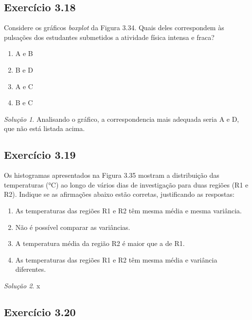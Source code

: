 \documentclass[
]{latex/krantz}
\providecommand{\tightlist}{%
  \setlength{\itemsep}{0pt}\setlength{\parskip}{0pt}}
\theoremstyle{definition}
\theoremstyle{definition}
\theoremstyle{definition}
\theoremstyle{definition}
\theoremstyle{remark}
\newtheorem*{solution}{Solução}
\begin{document}
\hypertarget{exr3-18}{%
\subsection*{Exercício 3.18}\label{exr3-18}}

Considere os gráficos \emph{boxplot} da Figura 3.34. Quais deles correspondem às pulsações dos estudantes submetidos a atividade física intensa e fraca?

\begin{enumerate}
\def\labelenumi{\alph{enumi})}
\tightlist
\item
  A e B
\item
  B e D
\item
  A e C
\item
  B e C
\end{enumerate}

\begin{solution}
Analisando o gráfico, a correspondencia mais adequada seria A e D, que não está listada acima.
\end{solution}

\hypertarget{exr3-19}{%
\subsection*{Exercício 3.19}\label{exr3-19}}

Os histogramas apresentados na Figura 3.35 mostram a distribuição das temperaturas (°C) ao longo de vários dias de investigação para duas regiões (R1 e R2). Indique se as afirmações abaixo estão corretas, justificando as respostas:

\begin{enumerate}
\def\labelenumi{\alph{enumi})}
\tightlist
\item
  As temperaturas das regiões R1 e R2 têm mesma média e mesma variância.
\item
  Não é possível comparar as variâncias.
\item
  A temperatura média da região R2 é maior que a de R1.
\item
  As temperaturas das regiões R1 e R2 têm mesma média e variância diferentes.
\end{enumerate}

\begin{solution}
x
\end{solution}

\hypertarget{exr3-20}{%
\subsection*{Exercício 3.20}\label{exr3-20}}
\end{document}
